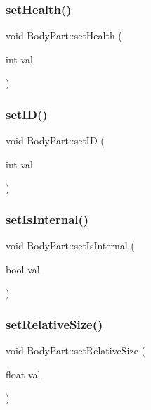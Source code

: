 \mbox{\label{class_body_part_aca91d2ed2644a952b437a3e1f5155318}} 
\subsubsection{\texorpdfstring{set\+Health()}{setHealth()}}
{\footnotesize\ttfamily void Body\+Part\+::set\+Health (\begin{DoxyParamCaption}\item[{int}]{val }\end{DoxyParamCaption})}

\mbox{\label{class_body_part_ac4d2365cc57317596096db2b56f52c91}} 
\subsubsection{\texorpdfstring{set\+I\+D()}{setID()}}
{\footnotesize\ttfamily void Body\+Part\+::set\+ID (\begin{DoxyParamCaption}\item[{int}]{val }\end{DoxyParamCaption})}

\mbox{\label{class_body_part_a6f1b8a920f6c5f7c7f32f51bbf721f6d}} 
\subsubsection{\texorpdfstring{set\+Is\+Internal()}{setIsInternal()}}
{\footnotesize\ttfamily void Body\+Part\+::set\+Is\+Internal (\begin{DoxyParamCaption}\item[{bool}]{val }\end{DoxyParamCaption})}

\mbox{\label{class_body_part_ab22b9412b4959e3a0a42efc79e409199}} 
\subsubsection{\texorpdfstring{set\+Relative\+Size()}{setRelativeSize()}}
{\footnotesize\ttfamily void Body\+Part\+::set\+Relative\+Size (\begin{DoxyParamCaption}\item[{float}]{val }\end{DoxyParamCaption})}

